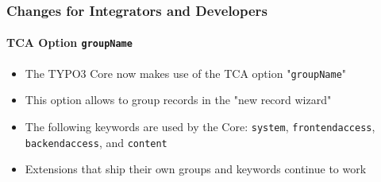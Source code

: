 %

\begin{frame}[fragile]
	\frametitle{Changes for Integrators and Developers}
	\framesubtitle{TCA Option \texttt{groupName}}

	\begin{itemize}
		\item The TYPO3 Core now makes use of the TCA option "\texttt{groupName}"
		\item This option allows to group records in the "new record wizard"
		\item The following keywords are used by the Core:\newline
			\small
				\texttt{system}, \texttt{frontendaccess}, \texttt{backendaccess}, and \texttt{content}
			\normalsize
		\item Extensions that ship their own groups and keywords continue to work
	\end{itemize}

\end{frame}

